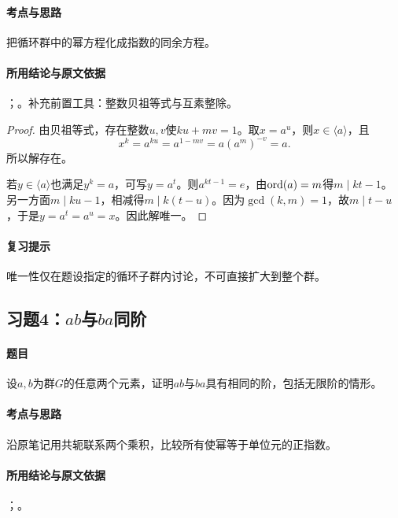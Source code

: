\paragraph{考点与思路}
把循环群中的幂方程化成指数的同余方程。

\paragraph{所用结论与原文依据}
；。补充前置工具：整数贝祖等式与互素整除。


\begin{proof}
由贝祖等式，存在整数$u,v$使$ku+mv=1$。取$x=a^u$，则$x\in\langle a\rangle$，且
\[
x^k=a^{ku}=a^{1-mv}=a(a^m)^{-v}=a.
\]
所以解存在。

若$y\in\langle a\rangle$也满足$y^k=a$，可写$y=a^t$。则$a^{kt-1}=e$，由$\operatorname{ord}(a)=m$得$m\mid kt-1$。另一方面$m\mid ku-1$，相减得$m\mid k(t-u)$。因为$\gcd(k,m)=1$，故$m\mid t-u$，于是$y=a^t=a^u=x$。因此解唯一。
\end{proof}

\paragraph{复习提示}
唯一性仅在题设指定的循环子群内讨论，不可直接扩大到整个群。


\subsection{习题4：\texorpdfstring{$ab$与$ba$同阶}{ab与ba同阶}}
\label{ex:2:4}

\paragraph{题目}
设$a,b$为群$G$的任意两个元素，证明$ab$与$ba$具有相同的阶，包括无限阶的情形。

\paragraph{考点与思路}
沿原笔记用共轭联系两个乘积，比较所有使幂等于单位元的正指数。

\paragraph{所用结论与原文依据}
；。

